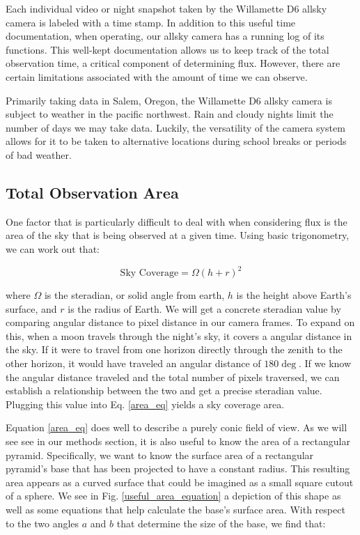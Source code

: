 Each individual video or night snapshot taken by the Willamette D6 allsky camera is labeled with a time stamp.  
In addition to this useful time documentation, when operating, our allsky camera has a running log of its functions.
This well-kept documentation allows us to keep track of the total observation time, a critical component of determining flux.  
However, there are certain limitations associated with the amount of time we can observe.

Primarily taking data in Salem, Oregon, the Willamette D6 allsky camera is subject to weather in the pacific northwest.  
Rain and cloudy nights limit the number of days we may take data.
Luckily, the versatility of the camera system allows for it to be taken to alternative locations during school breaks or periods of bad weather.


\subsection{Total Observation Area}
One factor that is particularly difficult to deal with when considering flux is the area of the sky that is being observed at a given time.
Using basic trigonometry, we can work out that:

\begin{equation}
    \text{Sky Coverage} = \Omega(h+r)^2
    \label{area_eq}
\end{equation}

where $\Omega$ is the steradian, or solid angle from earth, $h$ is the height above Earth's surface, and $r$ is the radius of Earth.
We will get a concrete steradian value by comparing angular distance to pixel distance in our camera frames.
To expand on this, when a moon travels through the night's sky, it covers a angular distance in the sky.  
If it were to travel from one horizon directly through the zenith to the other horizon, it would have traveled an angular distance of $180 \deg$.  
If we know the angular distance traveled and the total number of pixels traversed, we can establish a relationship between the two and get a precise steradian value.
Plugging this value into Eq. \ref{area_eq} yields a sky coverage area.

Equation \ref{area_eq} does well to describe a purely conic field of view.
As we will see see in our methods section, it is also useful to know the area of a rectangular pyramid.
Specifically, we want to know the surface area of a rectangular pyramid's base that has been projected to have a constant radius. 
This resulting area appears as a curved surface that could be imagined as a small square cutout of a sphere.
We see in Fig. \ref{useful_area_equation} a depiction of this shape as well as some equations that help calculate the base's surface area.
With respect to the two angles $a$ and $b$ that determine the size of the base, we find that:

